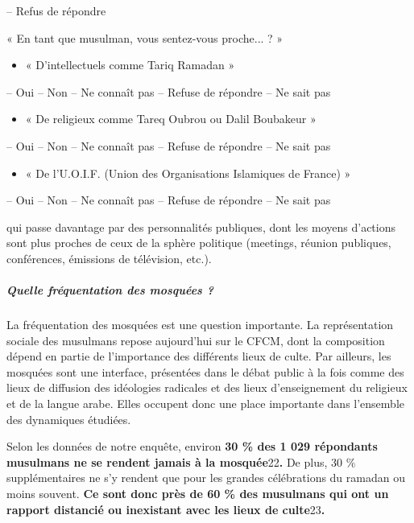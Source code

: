 -- Refus de répondre

« En tant que musulman, vous sentez-vous proche... ? »


\begin{itemize}
\item
  « D'intellectuels comme Tariq Ramadan »
\end{itemize}


-- Oui -- Non -- Ne connaît pas -- Refuse de répondre -- Ne sait pas


\begin{itemize}
\item
  « De religieux comme Tareq Oubrou ou Dalil Boubakeur »
\end{itemize}

-- Oui -- Non -- Ne connaît pas -- Refuse de répondre -- Ne sait pas

\begin{itemize}
\item
  « De l'U.O.I.F. (Union des Organisations Islamiques de France) »
\end{itemize}

-- Oui -- Non -- Ne connaît pas -- Refuse de répondre -- Ne sait pas




qui passe davantage par des personnalités publiques, dont les moyens
d'actions sont plus proches de ceux de la sphère politique (meetings,
réunion publiques, conférences, émissions de télévision, etc.).


\hypertarget{quelle-fruxe9quentation-des-mosquuxe9es}{%
\subparagraph{Quelle fréquentation des mosquées
?}\label{quelle-fruxe9quentation-des-mosquuxe9es}}


La fréquentation des mosquées est une question importante. La
représentation sociale des musulmans repose aujourd'hui sur le CFCM,
dont la composition dépend en partie de l'importance des différents
lieux de culte. Par ailleurs, les mosquées sont une interface,
présentées dans le débat public à la fois comme des lieux de diffusion
des idéologies radicales et des lieux d'enseignement du religieux et de
la langue arabe. Elles occupent donc une place importante dans
l'ensemble des dynamiques étudiées.

Selon les données de notre enquête, environ \textbf{30 \% des 1 029
répondants musulmans ne se rendent jamais à la mosquée}22\textbf{.} De
plus, 30 \% supplémentaires ne s'y rendent que pour les grandes
célébrations du ramadan ou moins souvent. \textbf{Ce sont donc près de
60 \% des musulmans qui ont un rapport distancié ou inexistant avec les
lieux de culte}23\textbf{.}

